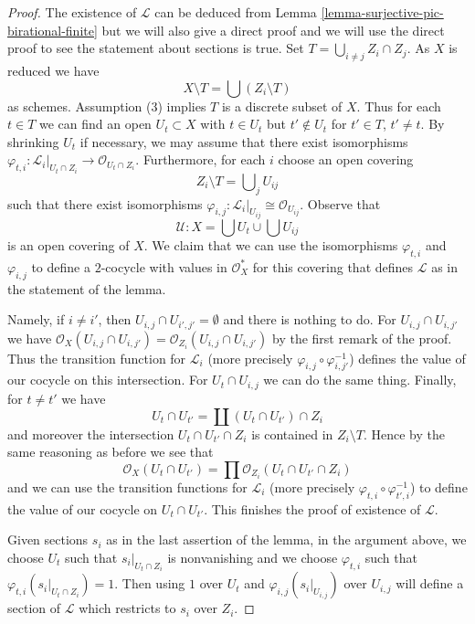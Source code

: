 \begin{proof}
The existence of $\mathcal{L}$ can be deduced from
Lemma \ref{lemma-surjective-pic-birational-finite}
but we will also give a direct proof and we will use
the direct proof to see the statement about sections is true.
Set $T = \bigcup_{i \not = j} Z_i \cap Z_j$. As $X$ is reduced we have
$$
X \setminus T = \bigcup (Z_i \setminus T)
$$
as schemes. Assumption (3) implies $T$ is a discrete subset of $X$.
Thus for each $t \in T$ we can find an open $U_t \subset X$
with $t \in U_t$ but $t' \not \in U_t$ for $t' \in T$, $t' \not = t$.
By shrinking $U_t$ if necessary, we may assume that there exist isomorphisms
$\varphi_{t, i} : \mathcal{L}_i|_{U_t \cap Z_i} \to
\mathcal{O}_{U_t \cap Z_i}$. Furthermore, for each $i$ choose an open covering
$$
Z_i \setminus T = \bigcup\nolimits_j U_{ij}
$$
such that there exist isomorphisms
$\varphi_{i, j} : \mathcal{L}_i|_{U_{ij}} \cong \mathcal{O}_{U_{ij}}$.
Observe that
$$
\mathcal{U} : X = \bigcup U_t \cup \bigcup U_{ij}
$$
is an open covering of $X$. We claim that we can use the isomorphisms
$\varphi_{t, i}$ and $\varphi_{i, j}$ to define a $2$-cocycle with values
in $\mathcal{O}_X^*$ for this covering that defines $\mathcal{L}$ as
in the statement of the lemma.

\medskip\noindent
Namely, if $i \not = i'$, then $U_{i, j} \cap U_{i', j'} = \emptyset$
and there is nothing to do. For $U_{i, j} \cap U_{i, j'}$ we have
$\mathcal{O}_X(U_{i, j} \cap U_{i, j'}) =
\mathcal{O}_{Z_i}(U_{i, j} \cap U_{i, j'})$ by the first remark of the proof.
Thus the transition function for $\mathcal{L}_i$ (more precisely
$\varphi_{i, j} \circ \varphi_{i, j'}^{-1}$) defines the value of our
cocycle on this intersection.
For $U_t \cap U_{i, j}$ we can do the same thing.
Finally, for $t \not = t'$ we have
$$
U_t \cap U_{t'} = \coprod (U_t \cap U_{t'}) \cap Z_i
$$
and moreover the intersection $U_t \cap U_{t'} \cap Z_i$ is contained
in $Z_i \setminus T$. Hence by the same reasoning as before we see that
$$
\mathcal{O}_X(U_t \cap U_{t'}) =
\prod \mathcal{O}_{Z_i}(U_t \cap U_{t'} \cap Z_i)
$$
and we can use the transition functions for $\mathcal{L}_i$ (more precisely
$\varphi_{t, i} \circ \varphi_{t', i}^{-1}$) to define the value of
our cocycle on $U_t \cap U_{t'}$. This finishes the proof of existence
of $\mathcal{L}$.

\medskip\noindent
Given sections $s_i$ as in the last assertion of the lemma, in the argument
above, we choose $U_t$ such that $s_i|_{U_t \cap Z_i}$ is nonvanishing and
we choose $\varphi_{t, i}$ such that $\varphi_{t, i}(s_i|_{U_t \cap Z_i}) = 1$.
Then using $1$ over $U_t$ and $\varphi_{i, j}(s_i|_{U_{i, j}})$ over
$U_{i, j}$ will define a section of $\mathcal{L}$ which restricts
to $s_i$ over $Z_i$.
\end{proof}


